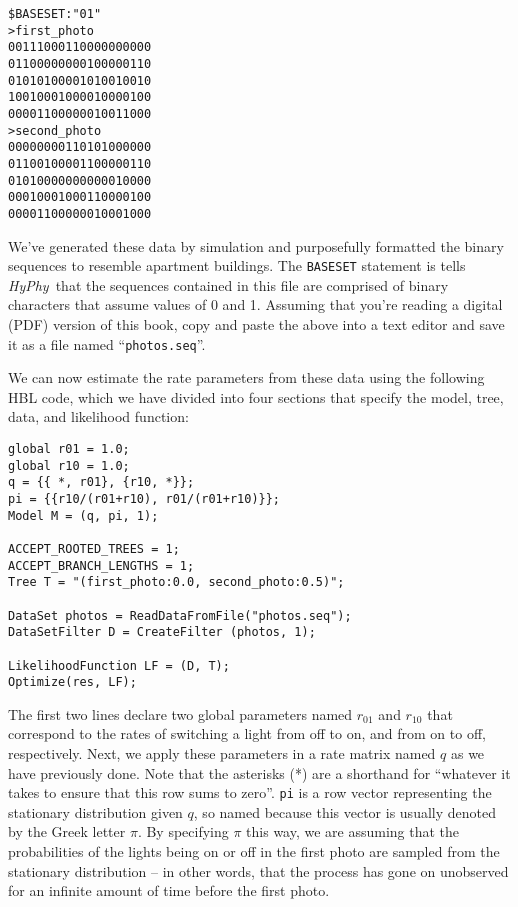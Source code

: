 \documentclass[12pt,twoside,openright]{book}
\newcommand{\hyphy}{\textit{HyPhy}}
\begin{document}
\begin{leftbar}
\begin{small}
\begin{verbatim}
$BASESET:"01"
>first_photo
00111000110000000000
01100000000100000110
01010100001010010010
10010001000010000100
00001100000010011000
>second_photo
00000000110101000000
01100100001100000110
01010000000000010000
00010001000110000100
00001100000010001000
\end{verbatim}
\end{small}
\end{leftbar}

\noindent We've generated these data by simulation and purposefully formatted the binary sequences to resemble apartment buildings.  The {\tt BASESET} statement is tells \hyphy\ that the sequences contained in this file are comprised of binary characters that assume values of 0 and 1.  Assuming that you're reading a digital (PDF) version of this book, copy and paste the above into a text editor and save it as a file named ``{\tt photos.seq}''.  

We can now estimate the rate parameters from these data using the following HBL code, which we have divided into four sections that specify the model, tree, data, and likelihood function:  

\begin{leftbar}
\begin{small}
\begin{verbatim}
global r01 = 1.0;
global r10 = 1.0;
q = {{ *, r01}, {r10, *}};
pi = {{r10/(r01+r10), r01/(r01+r10)}};
Model M = (q, pi, 1);

ACCEPT_ROOTED_TREES = 1;
ACCEPT_BRANCH_LENGTHS = 1;
Tree T = "(first_photo:0.0, second_photo:0.5)";

DataSet photos = ReadDataFromFile("photos.seq");
DataSetFilter D = CreateFilter (photos, 1);

LikelihoodFunction LF = (D, T);
Optimize(res, LF);
\end{verbatim}
\end{small}
\end{leftbar}

\noindent The first two lines declare two global parameters named $r_{01}$ and $r_{10}$ that correspond to the rates of switching a light from off to on, and from on to off, respectively.  Next, we apply these parameters in a rate matrix named $q$ as we have previously done.  Note that the asterisks (*) are a shorthand for ``whatever it takes to ensure that this row sums to zero''.  {\tt pi} is a row vector representing the stationary distribution given $q$, so named because this vector is usually denoted by the Greek letter $\pi$.  By specifying $\pi$ this way, we are assuming that the probabilities of the lights being on or off in the first photo are sampled from the stationary distribution -- in other words, that the process has gone on unobserved for an infinite amount of time before the first photo.
\end{document}
